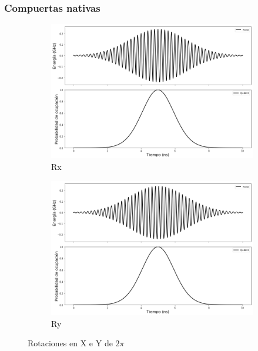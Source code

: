 \documentclass[xetex,mathserif,serif, 8pt]{beamer}
\begin{document}
\begin{frame}
    \frametitle{Compuertas nativas}

    \begin{figure}[H]
        \centering
        \begin{subfigure}[m]{0.49\textwidth}
            \centering \includegraphics[width=1\linewidth]{img/rx02pi.png}
            \caption{Rx}
        \end{subfigure}
        \begin{subfigure}[m]{0.49\textwidth}
            \centering \includegraphics[width=1\linewidth]{img/ry02pi.png}
            \caption{Ry}
        \end{subfigure}
        \caption[Rotaciones en X e Y de $2\pi$]{Rotaciones en X e Y de $2\pi$}
    \label{fig:rxry02pi}
    \end{figure}

\end{frame}
\end{document}
